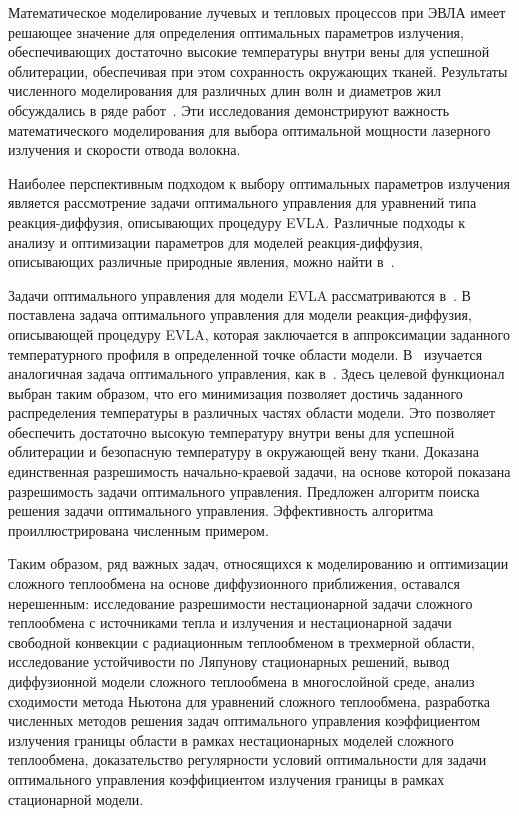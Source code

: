 Математическое моделирование лучевых и тепловых процессов при ЭВЛА
имеет решающее значение для определения оптимальных параметров
излучения, обеспечивающих достаточно высокие
температуры внутри вены для успешной облитерации,
обеспечивая при этом сохранность окружающих тканей.
Результаты численного моделирования для различных
длин волн и диаметров жил обсуждались в ряде работ~\cite{
    Opticalthermal_vanRuijven2014, Some_Poluektova2014,
    Endovenous_Malskat2014, Mathematical_Mordon2006
}.
Эти исследования демонстрируют важность математического моделирования
для выбора оптимальной мощности лазерного излучения и скорости отвода волокна.

Наиболее перспективным подходом к выбору оптимальных параметров
излучения является рассмотрение задачи оптимального управления
для уравнений типа реакция-диффузия, описывающих процедуру EVLA.
Различные подходы к анализу и оптимизации параметров для моделей реакция-диффузия,
описывающих различные природные явления, можно найти в~\cite{
Stability_Alekseev2016, Optimization_Brizitskii2018e,
chebotarev2018inverse, Theoretical_Maslovskaya2021
}.

Задачи оптимального управления для модели EVLA рассматриваются в~\cite{
    Optimal_Kovtanyuk2020,Inverse_Kovtanyuk2021 }.
В~\cite{Optimal_Kovtanyuk2020} поставлена задача оптимального управления для модели реакция-диффузия,
описывающей процедуру EVLA, которая заключается в аппроксимации заданного
температурного профиля в определенной точке области модели.
В~\cite{Inverse_Kovtanyuk2021} изучается аналогичная задача оптимального управления,
как в~\cite{Optimal_Kovtanyuk2020}.
Здесь целевой функционал выбран таким образом, что его минимизация позволяет
достичь заданного распределения температуры в различных частях области модели.
Это позволяет обеспечить достаточно высокую температуру внутри
вены для успешной облитерации и безопасную температуру в окружающей вену ткани.
Доказана единственная разрешимость начально-краевой задачи,
на основе которой показана разрешимость задачи оптимального управления.
Предложен алгоритм поиска решения задачи оптимального управления.
Эффективность алгоритма проиллюстрирована численным примером.



Таким образом, ряд важных задач, относящихся к моделированию и
оптимизации сложного теплообмена на основе
диффузионного приближения, оставался нерешенным: исследование
разрешимости нестационарной задачи сложного
теплообмена с источниками тепла и излучения и нестационарной задачи
свободной конвекции с радиационным теплообменом в трехмерной
области, исследование устойчивости по Ляпунову стационарных решений,
вывод диффузионной модели сложного теплообмена в многослойной среде,
анализ сходимости метода Ньютона
для уравнений сложного теплообмена, разработка численных
методов решения задач оптимального управления
коэффициентом излучения границы области в рамках нестационарных моделей
сложного теплообмена, доказательство регулярности
условий оптимальности для задачи оптимального управления коэффициентом
излучения границы в рамках стационарной модели.


